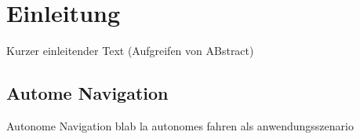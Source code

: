 %
\chapter{Einleitung}


Kurzer einleitender Text (Aufgreifen von ABstract)

\section{Autome Navigation}




Autonome Navigation blab la
autonomes fahren als anwendungsszenario
